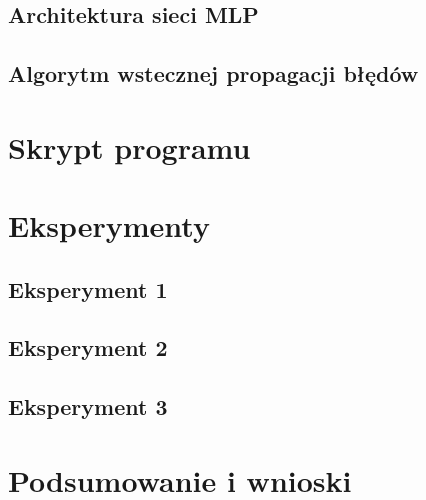 \documentclass[a4paper, 10pt]{article}
\begin{document}
\subsection{Architektura sieci MLP}
\subsection{Algorytm wstecznej propagacji błędów}

\section{Skrypt programu}

\section{Eksperymenty}
\subsection{Eksperyment 1}
\subsection{Eksperyment 2}
\subsection{Eksperyment 3}

\section{Podsumowanie i wnioski}
\end{document}
